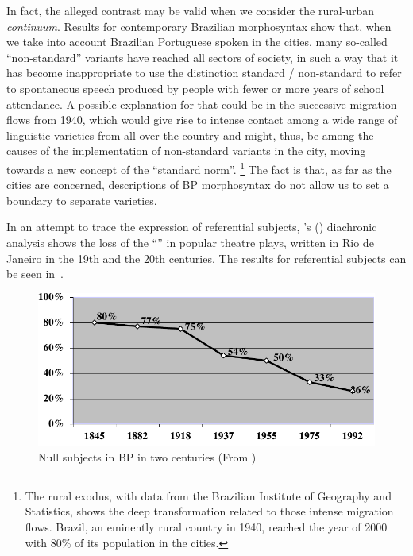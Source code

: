 \documentclass[output=paper]{langsci/langscibook}
\begin{document}
In fact, the alleged contrast may be valid when we consider the rural-urban
\emph{continuum}. Results for contemporary Brazilian morphosyntax show that,
when we take into account Brazilian Portuguese spoken in the cities, many
so-called “non-standard” variants have reached all sectors of society, in such
a way that it has become inappropriate to use the distinction standard /
non-standard to refer to spontaneous speech produced by people with fewer or
more years of school attendance. A possible explanation for that could be in
the successive migration flows from 1940, which would give rise to intense
contact among a wide range of linguistic varieties from all over the country
and might, thus, be among the causes of the implementation of non-standard
variants in the city, moving towards a new concept of the “standard norm”.
\footnote{The rural exodus, with data from the Brazilian Institute of Geography
and Statistics, shows the deep transformation related to those intense
migration flows. Brazil, an eminently rural country in 1940, reached the year
of 2000 with 80\% of its population in the cities.}  The fact is that, as far
as the cities are concerned, descriptions of \gls{BP}
morphosyntax do not allow us to set a boundary to separate varieties.

In an attempt to trace the expression of referential subjects,
\citeauthor{Duarte1993}’s (\citeyear{Duarte1993,Duarte2012}) diachronic
analysis shows the loss of the “” \citep{Chomsky1981} in
popular theatre plays, written in Rio de Janeiro in the 19th and the 20th
centuries. The results for referential subjects can be seen
in~.

\begin{figure}
    \centering
    \includegraphics[width=.75\textwidth]{./img/fig1.pdf}
\caption{Null subjects in \gls{BP} in two centuries
(From \citealt{Duarte1993})}
\label{fig:key:26.1}
\end{figure}
\end{document}
